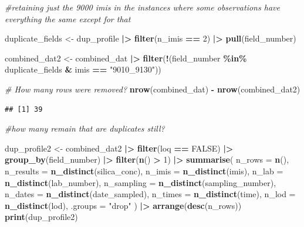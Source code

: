 \documentclass[
]{article}
\newenvironment{Shaded}{\begin{snugshade}}{\end{snugshade}}
\newcommand{\AttributeTok}[1]{\textcolor[rgb]{0.13,0.29,0.53}{#1}}
\newcommand{\CommentTok}[1]{\textcolor[rgb]{0.56,0.35,0.01}{\textit{#1}}}
\newcommand{\ConstantTok}[1]{\textcolor[rgb]{0.56,0.35,0.01}{#1}}
\newcommand{\DecValTok}[1]{\textcolor[rgb]{0.00,0.00,0.81}{#1}}
\newcommand{\FunctionTok}[1]{\textcolor[rgb]{0.13,0.29,0.53}{\textbf{#1}}}
\newcommand{\NormalTok}[1]{#1}
\newcommand{\OtherTok}[1]{\textcolor[rgb]{0.56,0.35,0.01}{#1}}
\newcommand{\SpecialCharTok}[1]{\textcolor[rgb]{0.81,0.36,0.00}{\textbf{#1}}}
\newcommand{\StringTok}[1]{\textcolor[rgb]{0.31,0.60,0.02}{#1}}
\begin{document}
\begin{Shaded}
\begin{Highlighting}[]
\CommentTok{\#retaining just the 9000 imis in the instances where some observations have everything the same except for that  }

\NormalTok{duplicate\_fields }\OtherTok{\textless{}{-}}\NormalTok{ dup\_profile }\SpecialCharTok{|\textgreater{}} 
  \FunctionTok{filter}\NormalTok{(n\_imis }\SpecialCharTok{==} \DecValTok{2}\NormalTok{) }\SpecialCharTok{|\textgreater{}} 
  \FunctionTok{pull}\NormalTok{(field\_number)}
 

\NormalTok{combined\_dat2 }\OtherTok{\textless{}{-}}\NormalTok{ combined\_dat }\SpecialCharTok{|\textgreater{}} 
  \FunctionTok{filter}\NormalTok{(}\SpecialCharTok{!}\NormalTok{(field\_number }\SpecialCharTok{\%in\%}\NormalTok{ duplicate\_fields }\SpecialCharTok{\&}\NormalTok{ imis }\SpecialCharTok{==} \StringTok{"9010\_9130"}\NormalTok{)) }

\CommentTok{\# How many rows were removed? }
\FunctionTok{nrow}\NormalTok{(combined\_dat) }\SpecialCharTok{{-}} \FunctionTok{nrow}\NormalTok{(combined\_dat2) }
\end{Highlighting}
\end{Shaded}

\begin{verbatim}
## [1] 39
\end{verbatim}

\begin{Shaded}
\begin{Highlighting}[]
\CommentTok{\#how many remain that are duplicates still?}

\NormalTok{dup\_profile2 }\OtherTok{\textless{}{-}}\NormalTok{ combined\_dat2 }\SpecialCharTok{|\textgreater{}} 
  \FunctionTok{filter}\NormalTok{(loq }\SpecialCharTok{==} \ConstantTok{FALSE}\NormalTok{) }\SpecialCharTok{|\textgreater{}} 
  \FunctionTok{group\_by}\NormalTok{(field\_number) }\SpecialCharTok{|\textgreater{}} 
  \FunctionTok{filter}\NormalTok{(}\FunctionTok{n}\NormalTok{() }\SpecialCharTok{\textgreater{}} \DecValTok{1}\NormalTok{) }\SpecialCharTok{|\textgreater{}} 
  \FunctionTok{summarise}\NormalTok{(}
    \AttributeTok{n\_rows      =} \FunctionTok{n}\NormalTok{(),}
    \AttributeTok{n\_results   =} \FunctionTok{n\_distinct}\NormalTok{(silica\_conc),}
    \AttributeTok{n\_imis      =} \FunctionTok{n\_distinct}\NormalTok{(imis),}
    \AttributeTok{n\_lab       =} \FunctionTok{n\_distinct}\NormalTok{(lab\_number),}
    \AttributeTok{n\_sampling  =} \FunctionTok{n\_distinct}\NormalTok{(sampling\_number),}
    \AttributeTok{n\_dates     =} \FunctionTok{n\_distinct}\NormalTok{(date\_sampled),}
    \AttributeTok{n\_times     =} \FunctionTok{n\_distinct}\NormalTok{(time),}
    \AttributeTok{n\_lod       =} \FunctionTok{n\_distinct}\NormalTok{(lod),}
    \AttributeTok{.groups =} \StringTok{"drop"}
\NormalTok{  ) }\SpecialCharTok{|\textgreater{}} 
  \FunctionTok{arrange}\NormalTok{(}\FunctionTok{desc}\NormalTok{(n\_rows)) }
\FunctionTok{print}\NormalTok{(dup\_profile2) }
\end{Highlighting}
\end{Shaded}
\end{document}
